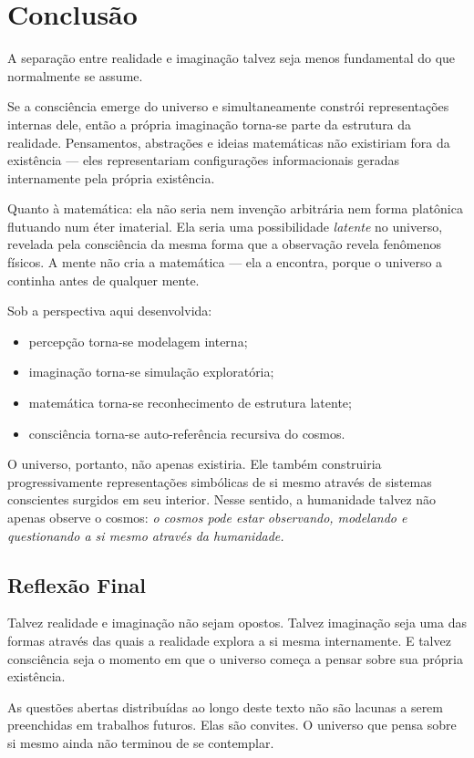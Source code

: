 \documentclass[12pt,a4paper]{article}
\begin{document}
\section{Conclusão}

A separação entre realidade e imaginação talvez seja menos fundamental
do que normalmente se assume.

Se a consciência emerge do universo e simultaneamente constrói
representações internas dele, então a própria imaginação torna-se parte
da estrutura da realidade. Pensamentos, abstrações e ideias matemáticas
não existiriam fora da existência — eles representariam configurações
informacionais geradas internamente pela própria existência.

Quanto à matemática: ela não seria nem invenção arbitrária nem forma
platônica flutuando num éter imaterial. Ela seria uma possibilidade
\textit{latente} no universo, revelada pela consciência da mesma forma
que a observação revela fenômenos físicos. A mente não cria a matemática
— ela a encontra, porque o universo a continha antes de qualquer mente.

Sob a perspectiva aqui desenvolvida:

\begin{itemize}
  \item percepção torna-se modelagem interna;
  \item imaginação torna-se simulação exploratória;
  \item matemática torna-se reconhecimento de estrutura latente;
  \item consciência torna-se auto-referência recursiva do cosmos.
\end{itemize}

O universo, portanto, não apenas existiria. Ele também construiria
progressivamente representações simbólicas de si mesmo através de sistemas
conscientes surgidos em seu interior. Nesse sentido, a humanidade talvez
não apenas observe o cosmos: \textit{o cosmos pode estar observando,
modelando e questionando a si mesmo através da humanidade.}

\subsection*{Reflexão Final}

\begin{displayquote}
  Talvez realidade e imaginação não sejam opostos.
  Talvez imaginação seja uma das formas através das quais a realidade
  explora a si mesma internamente.
  E talvez consciência seja o momento em que o universo começa a pensar
  sobre sua própria existência.
\end{displayquote}

As questões abertas distribuídas ao longo deste texto não são lacunas
a serem preenchidas em trabalhos futuros. Elas são convites. O universo
que pensa sobre si mesmo ainda não terminou de se contemplar.

\newpage
\printbibliography[title={Referências}]
\end{document}
